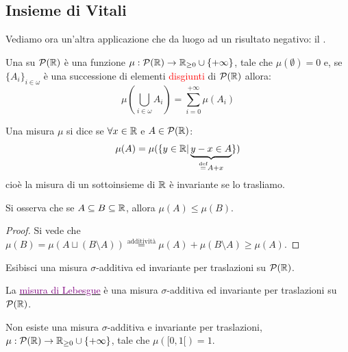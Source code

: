 \subsection{Insieme di Vitali}

Vediamo ora un'altra applicazione che da luogo ad un risultato negativo: il .

\begin{definition}
	Una  su $\mathcal{P}(\mathbb R)$ \`e una funzione $\mu : \mathcal{P}(\mathbb R) \rightarrow \mathbb R_{\geq 0}\cup\{+\infty\}$, tale che $\mu(\emptyset) = 0$ e, se $\{A_i\}_{i \in \omega}$ \`e 
	una successione di elementi \textcolor{red}{disgiunti} di $\mathcal{P}(\mathbb R)$ allora:
	\[ \mu\left(\bigcup_{i \in\omega} A_i\right) = \sum_{i = 0}^{+\infty} \mu(A_i)
		\]
\end{definition}

\begin{definition}
	Una misura $\mu$ si dice  se $\forall x \in \mathbb R$ e $A \in \mathcal{P}(\mathbb R)$:
	\[ \mu(A) = \mu(\{y \in \mathbb R | \underbrace{y - x \in A}_{\overset{\text{def}}{=} A + x}\})
		\]
	cio\`e la misura di un sottoinsieme di $\mathbb R$ \`e invariante se lo trasliamo.
\end{definition}

\begin{remark}
	Si osserva che se $A \subseteq B \subseteq \mathbb R$, allora $\mu(A) \leq \mu(B)$.
\end{remark}

\begin{proof}
	Si vede che $\mu(B) = \mu(A \sqcup (B \setminus A)) \overset{\text{additivit\`a}}{=} \mu(A) + \mu(B \setminus A) \geq \mu(A)$.
\end{proof}

\begin{exercise}
	Esibisci una misura $\sigma$-additiva ed invariante per traslazioni su $\mathcal{P}(\mathbb R)$.
\end{exercise}

\begin{soln}
	La \href{https://en.wikipedia.org/wiki/Lebesgue_measure}{\textcolor{purple}{misura di Lebesgue}} \`e una misura $\sigma$-additiva ed invariante per traslazioni su $\mathcal{P}(\mathbb R)$.
\end{soln}

\begin{proposition}
	Non esiste una misura $\sigma$-additiva e invariante per traslazioni, $\mu : \mathcal{P}(\mathbb R) \to \mathbb R_{\geq 0} \cup \{+\infty\}$, tale che $\mu([0,1[) = 1$.
\end{proposition}

